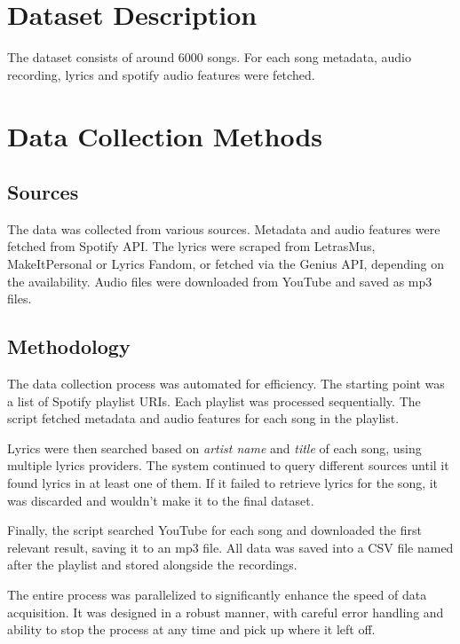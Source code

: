 
\section{Dataset Description}
\label{sec:datasetdescription}

The dataset consists of around 6000 songs. For each song metadata, audio
recording, lyrics and spotify audio features were fetched.

\section{Data Collection Methods}
\label{sec:datacollectionmethods}

\subsection{Sources}
The data was collected from various sources. Metadata and audio features were
fetched from Spotify API. The lyrics were scraped from LetrasMus,
MakeItPersonal or Lyrics Fandom, or fetched via the Genius API, depending on
the availability. Audio files were downloaded from YouTube and saved as mp3
files.

\subsection{Methodology}
The data collection process was automated for efficiency. The starting point
was a list of Spotify playlist URIs. Each playlist was processed sequentially. 
The script fetched metadata and audio features for each song in the
playlist.

Lyrics were then searched based on \textit{artist name} and \textit{title} of
each song, using multiple lyrics providers. The system continued to query
different sources until it found lyrics in at least one of them. If it failed
to retrieve lyrics for the song, it was discarded and wouldn't make it to the
final dataset.

Finally, the script  searched YouTube for each song and downloaded the first
relevant result, saving it to an mp3 file. All data was saved into a CSV
file named after the playlist and stored alongside the recordings.

The entire process was parallelized to significantly enhance the speed of data
acquisition. It was designed in a robust manner, with careful error handling
and ability to stop the process at any  time and pick up where it left off.

